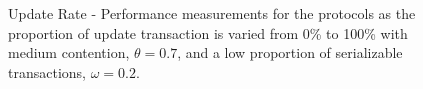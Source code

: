 \begin{figure}[htbp]
  \centering
  \par\medskip
  \par\medskip
  \par\medskip
  \caption{Update Rate - Performance measurements for the protocols as the
    proportion of update transaction is varied from 0\% to 100\% with medium contention,
    $\theta=0.7$, and a low proportion of serializable transactions, $\omega=0.2$.}
  \label{fig:update-exp}
\end{figure}
